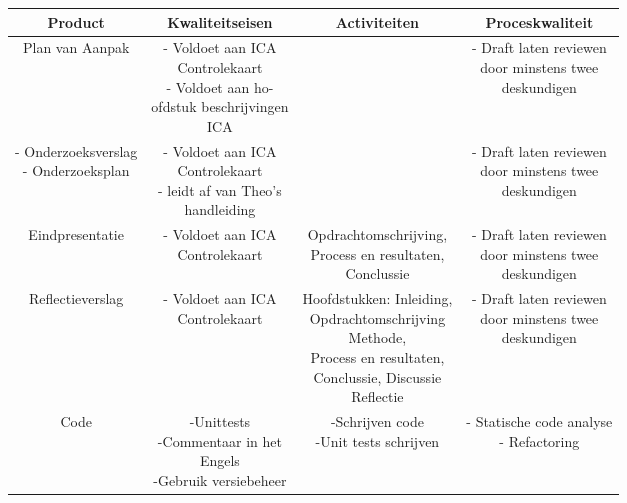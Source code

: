 \small
\begin{center}
 \begin{tabular}{|c c c c|} 
 
 \hline
 Product & Kwaliteitseisen & Activiteiten & Proceskwaliteit \\ [0.5ex] 
 \hline
 Plan van Aanpak & \makecell{
 - Voldoet aan ICA\\Controlekaart \cite{icaControl}\\
 - Voldoet aan ho-\\ofdstuk beschrijvingen\\ICA\cite{pvaTut}
 } & \cite{pvaTut} & \makecell{
 - Draft laten reviewen\\door minstens twee\\deskundigen
 } \\
 \hline

 \hline
 \makecell{
 - Onderzoeksverslag\\
 - Onderzoeksplan
 } & \makecell{
 - Voldoet aan ICA\\Controlekaart \cite{icaControl}\\
 - leidt af van Theo's\\ handleiding \cite{theoOnderzoek}
 } & \cite{theoOnderzoek} & \makecell{
 - Draft laten reviewen\\door minstens twee\\deskundigen
 } \\
 \hline
 
 \hline
 Eindpresentatie & \makecell{
 - Voldoet aan ICA\\Controlekaart \cite{icaControl}
 } & \makecell{Opdrachtomschrijving,\\Process en resultaten,\\Conclussie} & \makecell{
 - Draft laten reviewen\\door minstens twee\\deskundigen
 } \\
 \hline
 
 \hline
 Reflectieverslag & \makecell{
 - Voldoet aan ICA\\Controlekaart \cite{icaControl}
 } & \makecell{
 Hoofdstukken: Inleiding,\\
 Opdrachtomschrijving\\
 Methode,\\
 Process en resultaten,\\
 Conclussie, Discussie\\
 Reflectie\\
 }& \makecell{
 - Draft laten reviewen\\door minstens twee\\deskundigen
 } \\
 \hline
 
 \hline
 Code & \makecell{
 -Unittests\\
 -Commentaar in het\\ Engels\\
 -Gebruik versiebeheer
 } & \makecell{
 -Schrijven code\\
 -Unit tests schrijven
 } & \makecell{
 - Statische code analyse\\
 - Refactoring
 } \\
 \hline
\end{tabular}
\end{center}
